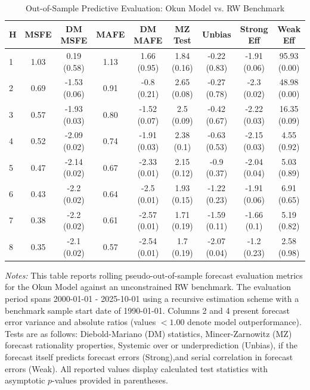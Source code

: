 \begin{table}[htbp]
\centering
\caption{Out-of-Sample Predictive Evaluation: Okun Model vs. RW Benchmark}
\label{tab:okun_model_evaluation}
\footnotesize
\begin{tabular}{l cccccccc}
\hline\hline
\rule{0pt}{3ex}
\textbf{H} & \textbf{MSFE} & \textbf{DM MSFE} & \textbf{MAFE} & \textbf{DM MAFE} & \textbf{MZ Test} & \textbf{Unbias} & \textbf{Strong Eff} & \textbf{Weak Eff} \\[0.5ex]
\hline
\rule{0pt}{2.5ex}
1 & 1.03 & 0.19 (0.58) & 1.13 & 1.66 (0.95) & 1.84 (0.16) & -0.22 (0.83) & -1.91 (0.06) & 95.93 (0.00) \\
2 & 0.69 & -1.53 (0.06) & 0.91 & -0.8 (0.21) & 2.65 (0.08) & -0.27 (0.78) & -2.3 (0.02) & 48.98 (0.00) \\
3 & 0.57 & -1.93 (0.03) & 0.80 & -1.52 (0.07) & 2.5 (0.09) & -0.42 (0.67) & -2.22 (0.03) & 16.35 (0.09) \\
4 & 0.52 & -2.09 (0.02) & 0.74 & -1.91 (0.03) & 2.38 (0.1) & -0.63 (0.53) & -2.15 (0.03) & 4.55 (0.92) \\
5 & 0.47 & -2.14 (0.02) & 0.67 & -2.33 (0.01) & 2.15 (0.12) & -0.9 (0.37) & -2.04 (0.04) & 5.03 (0.89) \\
6 & 0.43 & -2.2 (0.02) & 0.64 & -2.5 (0.01) & 1.93 (0.15) & -1.22 (0.23) & -1.91 (0.06) & 6.91 (0.65) \\
7 & 0.38 & -2.2 (0.02) & 0.61 & -2.57 (0.01) & 1.71 (0.19) & -1.59 (0.11) & -1.66 (0.1) & 5.19 (0.82) \\
8 & 0.35 & -2.1 (0.02) & 0.57 & -2.54 (0.01) & 1.7 (0.19) & -2.07 (0.04) & -1.2 (0.23) & 2.58 (0.98) \\
\hline\hline
\end{tabular}%
\par\smallskip
\parbox{\textwidth}{\scriptsize \textit{Notes:} This table reports rolling pseudo-out-of-sample forecast evaluation metrics for the Okun Model against an unconstrained RW benchmark. The evaluation period spans 2000-01-01 - 2025-10-01 using a recursive estimation scheme with a benchmark sample start date of 1990-01-01. Columns 2 and 4 present forecast error variance and absolute ratios (values $< 1.00$ denote model outperformance). Tests are as follows: Diebold-Mariano (DM) statistics, Mincer-Zarnowitz (MZ) forecast rationality properties, Systemic over or underprediction (Unbias), if the forecast itself predicts forecast errors (Strong),and serial correlation in forecast errors (Weak). All reported values display calculated test statistics with asymptotic $p$-values provided in parentheses.}
\end{table}
